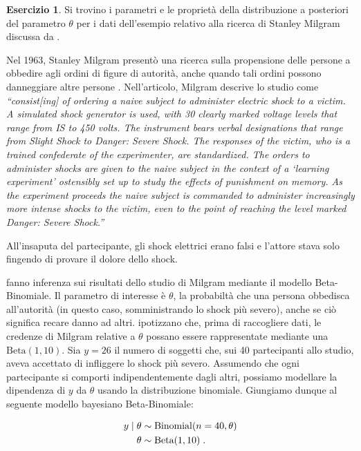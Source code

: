 \documentclass[
  11pt,
]{krantz}
\DeclareMathOperator{\Bin}{Binomial} %
\theoremstyle{definition}
\theoremstyle{definition}
\theoremstyle{definition}
\newtheorem{exercise}{Esercizio}[chapter]
\theoremstyle{definition}
\theoremstyle{remark}
\begin{document}
\begin{exercise}

Si trovino i parametri e le proprietà della distribuzione a posteriori del parametro \(\theta\) per i dati dell'esempio relativo alla ricerca di Stanley Milgram discussa da \citet{Johnson2022bayesrules}.

Nel 1963, Stanley Milgram presentò una ricerca sulla propensione delle persone a obbedire agli ordini di figure di autorità, anche quando tali ordini possono danneggiare altre persone \citep{milgram1963behavioral}. Nell'articolo, Milgram descrive lo studio come \emph{``consist{[}ing{]} of ordering a naive subject to administer electric shock to a victim. A simulated shock generator is used, with 30 clearly marked voltage levels that range from IS to 450 volts. The instrument bears verbal designations that range from Slight Shock to Danger: Severe Shock. The responses of the victim, who is a trained confederate of the experimenter, are standardized. The orders to administer shocks are given to the naive subject in the context of a `learning experiment' ostensibly set up to study the effects of punishment on memory. As the experiment proceeds the naive subject is commanded to administer increasingly more intense shocks to the victim, even to the point of reaching the level marked Danger: Severe Shock.''}

All'insaputa del partecipante, gli shock elettrici erano falsi e l'attore stava solo fingendo di provare il dolore dello shock.

\citet{Johnson2022bayesrules} fanno inferenza sui risultati dello studio di Milgram mediante il modello Beta-Binomiale. Il parametro di interesse è \(\theta\), la probabiltà che una persona obbedisca all'autorità (in questo caso, somministrando lo shock più severo), anche se ciò significa recare danno ad altri. \citet{Johnson2022bayesrules} ipotizzano che, prima di raccogliere dati, le credenze di Milgram relative a \(\theta\) possano essere rappresentate mediante una \(\mbox{Beta}(1, 10)\). Sia \(y = 26\) il numero di soggetti che, sui 40 partecipanti allo studio, aveva accettato di infliggere lo shock più severo. Assumendo che ogni partecipante si comporti indipendentemente dagli altri, possiamo modellare la dipendenza di \(y\) da \(\theta\) usando la distribuzione binomiale. Giungiamo dunque al seguente modello bayesiano Beta-Binomiale:

\begin{align}
y \mid \theta & \sim \Bin(n = 40, \theta) \notag\\
\theta & \sim \text{Beta}(1, 10) \; . \notag
\end{align}


\end{exercise}
\end{document}
